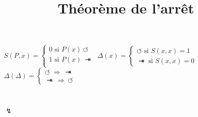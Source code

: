 \documentclass{article}
\title{Théorème de l'arrêt}
\date{}
\begin{document}
\maketitle
\thispagestyle{empty}
\begin{large}

\noindent$S(P,x)=\begin{cases}
\text{$0$ si $P(x)\  \mathbf{\circlearrowleft}$}\\
\text{$1$ si $P(x)\ \rightarrowbar $}\\
\end{cases}$
\vspace{10pt}
\newline
$\Delta(x)=\begin{cases}
\text{$\circlearrowleft$ si $S(x,x)=1$}\\
\text{$\rightarrowbar$ si $S(x,x)=0$}\ 
\end{cases}$
\vspace{10pt}
\newline
$\Delta(\Delta)=\begin{cases}
\text{$\circlearrowleft\ \Rightarrow \  \rightarrowbar$}\\
\text{$\rightarrowbar\ \Rightarrow \  \circlearrowleft$ }
\end{cases}$
\end{large}
\ \ \ \ \ \ \begin{huge} $\mathbf{\lightning}$ 
\end{huge}
\end{document}
